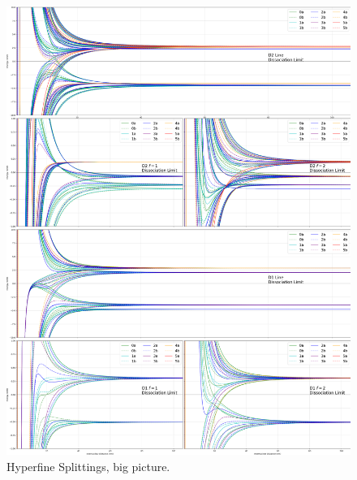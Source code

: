 \documentclass[prl, longbibliography]{revtex4-2}
\begin{document}
\begin{figure}
  \centering
    \includegraphics[width=\textwidth]{Hyperfine_Splitting_Big_Picture}
    \caption{Hyperfine Splittings, big picture. }
\end{figure}
\end{document}
